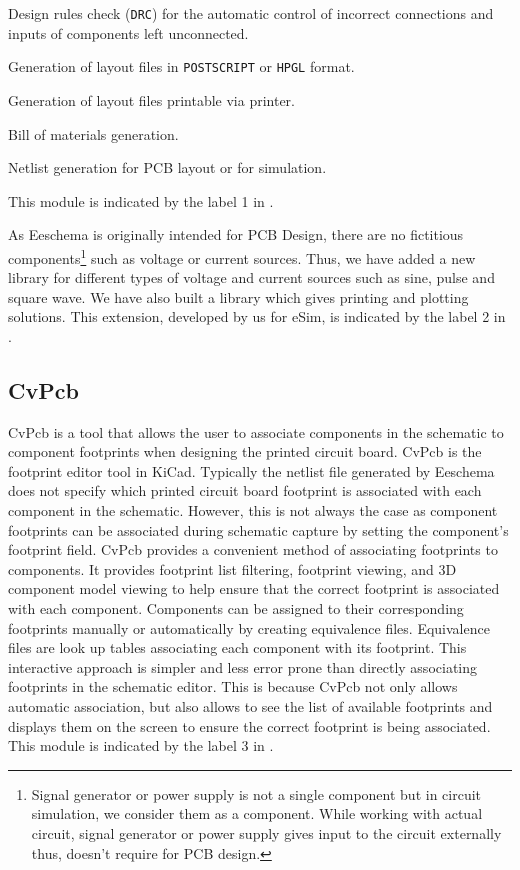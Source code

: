 \begin{inparaenum}
\item Design rules check  ({\tt DRC}) for 
the automatic control of incorrect connections and inputs of components 
left unconnected.
\item Generation of layout files in {\tt POSTSCRIPT} or 
{\tt HPGL}  format.
\item Generation of layout files printable via printer.
\item Bill of materials generation.
\item Netlist generation for PCB layout or for simulation.
\end{inparaenum}

This module is indicated by the label 1 in .

As Eeschema is originally intended for PCB Design, there are no
fictitious components\footnote{Signal generator or power supply is not
  a single component but in circuit simulation, we consider them as a
  component.  While working with actual circuit, signal generator or
  power supply gives input to the circuit externally thus, doesn't
  require for PCB design.} such as voltage or current sources. Thus,
we have added a new library for different types of voltage and current
sources such as sine, pulse and square wave.  We have also built a
library which gives printing and plotting solutions.
This extension, developed by us for eSim, is indicated by the label
2 in .

\subsection {CvPcb}
 CvPcb is a tool that allows the user to associate
components in the schematic to component footprints when designing the
printed circuit board. CvPcb is the footprint editor tool in KiCad.
Typically the netlist file generated by Eeschema does
not specify which printed circuit board footprint is associated with
each component in the schematic. However, this is not always the case
as component footprints can be associated during schematic capture by
setting the component's footprint field. CvPcb provides a convenient
method of associating footprints to components. It provides footprint
list filtering, footprint viewing, and 3D component model viewing to
help ensure that the correct footprint is associated with each
component. Components can be assigned to their corresponding
footprints manually or automatically by creating equivalence
files. Equivalence files are look up tables associating each component
with its footprint. This interactive approach is simpler and less
error prone than directly associating footprints in the schematic
editor.  This is because CvPcb not only allows automatic association,
but also allows to see the list of available footprints and displays
them on the screen to ensure the correct footprint is being
associated.  This module is indicated by the label 3 in
.  


